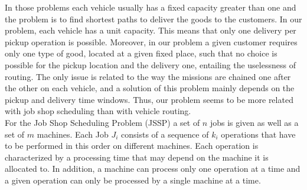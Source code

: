 \documentclass[a4paper,12pt]{article}
\begin{document}
In those problems each vehicle usually has a fixed capacity greater than one and the problem is to find shortest paths to deliver the goods to the customers. In our problem, each vehicle has a unit capacity. This means that only one delivery per pickup operation is possible. Moreover, in our problem a given customer requires only one type of good, located at a given fixed place, such that no choice is possible for the pickup location and the delivery one, entailing the uselessness of routing. The only issue is related to the way the missions are chained one after the other on each vehicle, and a solution of this problem mainly depends on the pickup and delivery time windows. Thus, our problem seems to be more related with job shop scheduling than with vehicle routing.\\




For the Job Shop Scheduling Problem (JSSP) a set of $n$ jobs is given as well as a set of $m$ machines. Each Job $J_i$ consists of a sequence of $k_i$ operations that have to be performed in this order on different machines. Each operation is characterized by a processing time that may depend on the machine it is allocated to. In addition, a machine can process only one operation at a time and a given operation can only be processed by a single machine at a time. \\
\end{document}
